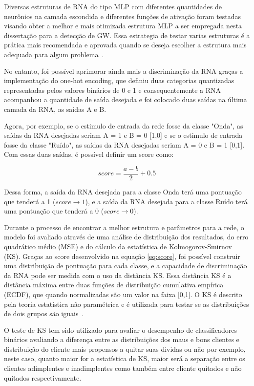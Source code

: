 Diversas estruturas de RNA do tipo MLP com diferentes quantidades de neurônios na camada escondida e diferentes funções de ativação foram testadas visando obter a melhor e mais otimizada estrutura MLP a ser empregada nesta dissertação para a detecção de GW. Essa estrategia de testar varias estruturas é a prática mais recomendada e aprovada quando se deseja escolher a estrutura mais adequada para algum problema~\cite{OKOH201619}.

No entanto, foi possível aprimorar ainda mais a discriminação da RNA graças a implementação do one-hot encoding, que definiu duas categorias quantizadas representadas pelos valores binários de 0 e 1 e consequentemente a RNA acompanhou a quantidade de saída desejada e foi colocado duas saídas na última camada da RNA, as saídas A e B. 

Agora, por exemplo, se o estimulo de entrada da rede fosse da classe "Onda", as saídas da RNA desejadas seriam A = 1 e B = 0 [1,0] e se o estimulo de entrada fosse da classe "Ruído", as saídas da RNA desejadas seriam A = 0 e B = 1 [0,1]. Com essas duas saídas, é possível definir um score como:

\begin{equation}
score = \frac{a-b}{2}+0.5
\label{eq:score}
\end{equation}

Dessa forma, a saída da RNA desejada para a classe Onda terá uma pontuação que tenderá a 1 ($score \rightarrow 1$), e a saída da RNA desejada para a classe Ruído terá uma pontuação que tenderá a 0 ($score \rightarrow 0$). 

Durante o processo de encontrar a melhor estrutura e parâmetros para a rede, o modelo foi avaliado através de uma análise de distribuição dos resultados, do erro quadrático médio (MSE) e do cálculo da estatística de Kolmogorov-Smirnov (KS). Graças ao score desenvolvido na equação \ref{eq:score}, foi possível construir uma distribuição de pontuação para cada classe, e a capacidade de discriminação da RNA pode ser medida com o uso da distância KS. Essa distância KS é a distância máxima entre duas funções de distribuição cumulativa empírica (ECDF), que quando normalizadas são um valor na faixa [0,1]. O KS é descrito pela teoria estatística não paramétrica e é utilizada para testar se as distribuições de dois grupos são iguais~\cite{daniel2000applied}. 

O teste de KS tem sido utilizado para avaliar o desempenho de classificadores binários avaliando a diferença entre as distribuições dos maus e bons clientes \cite{karcher2009redes} e distribuição do cliente mais propensos a quitar suas dividas ou não \cite{forti2018tecnicas}  por exemplo, neste caso, quanto maior for a estatística de KS, maior será a separação entre os clientes adimplentes e inadimplentes como também entre cliente quitados e não quitados respectivamente. 

